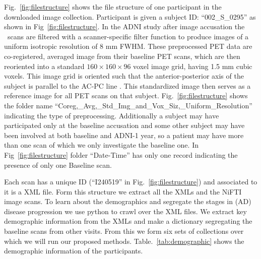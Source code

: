 Fig.~\ref{fig:filestructure} shows the file structure of one participant in the downloaded image collection. Participant is given a subject ID: ``002\_S\_0295'' as shown in Fig~\ref{fig:filestructure}. In the ADNI study after image accusation the \FDGPET ~scans are filtered with a scanner-specific filter function to produce images of a uniform isotropic resolution of 8 mm FWHM. These preprocessed PET data are co-registered, averaged image from their baseline PET scans, which are then reoriented into a standard $160\times160\times96$ voxel image grid, having 1.5 mm cubic voxels. This image grid is oriented such that the anterior-posterior axis of the subject is parallel to the AC-PC line \citep{lee2014parametric}. This standardized image then serves as a reference image for all PET scans on that subject. Fig.~\ref{fig:filestructure} shows the folder name ``Coreg,\_Avg,\_Std\_Img\_and\_Vox\_Siz,\_Uniform\_Resolution'' indicating the type of preprocessing. Additionally a subject may have participated only at the baseline accusation and some other subject may have been involved at both baseline and ADNI-1 year, so a patient may have more than one scan of which we only investigate the baseline one. In Fig~\ref{fig:filestructure} folder ``Date-Time'' has only one record indicating the presence of only one Baseline scan.

Each scan has a unique ID (``I240519'' in Fig.~\ref{fig:filestructure}) and associated to it is a XML file. Form this structure we extract all the XMLs and the NiFTI image scans. To learn about the demographics and segregate the stages in (AD) disease progression we use python to crawl over the XML files. We extract key demographic information from the XMLs and make a dictionary segregating the baseline scans from other visits. From this we form six sets of collections over which we will run our proposed methods. Table.~\ref{tab:demographic} shows the demographic information of the participants.  



